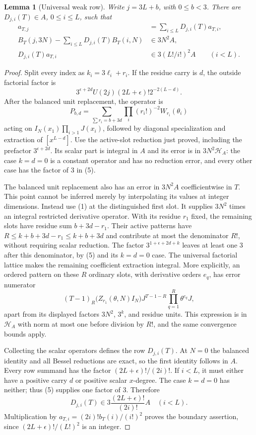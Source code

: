 \documentclass[11pt,a4paper]{article}
\newtheorem{lemma}[theorem]{Lemma}
\theoremstyle{definition}\newtheorem{definition}[theorem]{Definition}
\theoremstyle{remark}\newtheorem{remark}[theorem]{Remark}
\numberwithin{equation}{section}
\begin{document}
\begin{lemma}[Universal weak row]
\label{AP:lem:universal-weak-row}
Write $j=3L+b$, with $0\le b<3$.  There are
$D_{j,i}(T)\in A$, $0\le i\le L$, such that
\begin{align*}
 a_{T,j}&=\sum_{i\le L}D_{j,i}(T)a_{T,i},\\
 B_T(j,3N)-\sum_{i\le L}D_{j,i}(T)B_T(i,N)
                         &\in3N^2A,\\
 D_{j,i}(T)a_{T,i}&\in3(L!/i!)^2A\qquad(i<L).
\end{align*}
\end{lemma}
\begin{proof}
Split every index as $k_i=3\ell_i+r_i$.  If the residue carry is $d$,
the outside factorial factor is
\[
 3^{\epsilon+2d}U(2j)(2L+\epsilon)!2^{-2(L-d)}.
\]
After the balanced unit replacement, the operator is
\[
 P_{b,d}=\sum_{\sum r_i=b+3d}\prod_i(r_i!)^{-2}W_{r_i}(\theta_i)
\]
acting on $I_N(x_1)\prod_{i>1}J(x_i)$, followed by diagonal
specialization and extraction of $[x^{L-d}]$.
Use the active-slot reduction just proved, including the prefactor
$3^{\epsilon+2d}$.  Its scalar part is integral in $A$ and its
error is in $3N^2\mathcal H_A$: the case $k=d=0$ is a constant
operator and has no reduction error, and every other case has the
factor of $3$ in (5).

The balanced unit replacement also has an error in $3N^2A$
coefficientwise in $T$.  This point cannot be inferred merely by
interpolating its values at integer dimensions.  Instead use (1) at
the distinguished first slot.  It supplies $3N^2$ times an integral
restricted derivative operator.  With its residue $r_1$ fixed, the
remaining slots have residue sum $b+3d-r_1$.  Their active patterns
have $R\le k+b+3d-r_1\le k+b+3d$ and contribute at most the
denominator $R!$, without requiring scalar reduction.  The factor
$3^{1+\epsilon+2d+k}$ leaves at least one $3$ after this denominator,
by (5) and its $k=d=0$ case.  The universal factorial lattice makes
the remaining coefficient extraction integral.
More explicitly, an ordered pattern on these $R$ ordinary slots,
with derivative orders $e_q$, has error numerator
\[
 (T-1)_R\bigl(Z_{r_1}(\theta,N)I_N\bigr)
                     J^{T-1-R}\prod_{q=1}^R\theta^{e_q}J,
\]
apart from its displayed factors $3N^2$, $3^k$, and residue units.
This expression is in $\mathcal H_A$ with norm at most one before
division by $R!$, and the same convergence bounds apply.

Collecting the scalar operators defines the row $D_{j,i}(T)$.
At $N=0$ the balanced identity and all Bessel reductions are exact,
so the first identity follows in $A$.  Every row summand has the
factor $(2L+\epsilon)!/(2i)!$.  If $i<L$, it must either have a
positive carry $d$ or positive scalar $x$-degree.  The case $k=d=0$
has neither; thus (5) supplies one factor of $3$.  Therefore
\[
 D_{j,i}(T)\in3\frac{(2L+\epsilon)!}{(2i)!}A\quad(i<L).
\]
Multiplication by
$a_{T,i}=(2i)!b_T(i)/(i!)^2$ proves the boundary assertion, since
$(2L+\epsilon)!/(L!)^2$ is an integer.
\end{proof}
\end{document}
